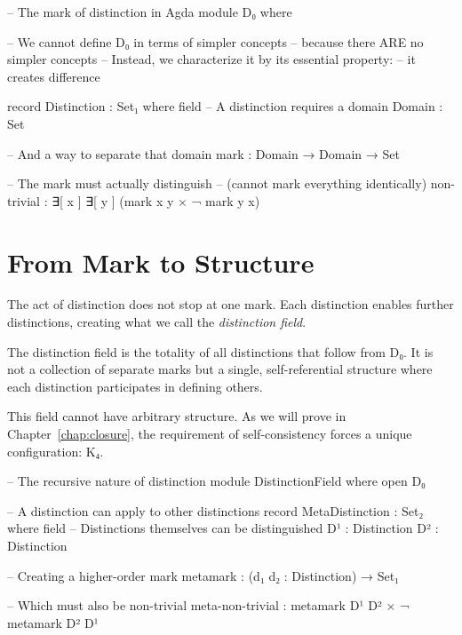 \begin{code}
-- The mark of distinction in Agda
module D₀ where

-- We cannot define D₀ in terms of simpler concepts
-- because there ARE no simpler concepts
-- Instead, we characterize it by its essential property:
-- it creates difference

record Distinction : Set₁ where
  field
    -- A distinction requires a domain
    Domain : Set
    
    -- And a way to separate that domain
    mark : Domain → Domain → Set
    
    -- The mark must actually distinguish
    -- (cannot mark everything identically)
    non-trivial : ∃[ x ] ∃[ y ] (mark x y × ¬ mark y x)
\end{code}

\section{From Mark to Structure}

The act of distinction does not stop at one mark. Each distinction enables further distinctions, creating what we call the \textit{distinction field}.

\begin{definition}
\label{def:distinction-field}
The distinction field is the totality of all distinctions that follow from D₀. It is not a collection of separate marks but a single, self-referential structure where each distinction participates in defining others.
\end{definition}

This field cannot have arbitrary structure. As we will prove in Chapter~\ref{chap:closure}, the requirement of self-consistency forces a unique configuration: K₄.

\begin{code}
-- The recursive nature of distinction
module DistinctionField where
  open D₀
  
  -- A distinction can apply to other distinctions
  record MetaDistinction : Set₂ where
    field
      -- Distinctions themselves can be distinguished
      D¹ : Distinction
      D² : Distinction
      
      -- Creating a higher-order mark
      metamark : (d₁ d₂ : Distinction) → Set₁
      
      -- Which must also be non-trivial
      meta-non-trivial : metamark D¹ D² × ¬ metamark D² D¹
\end{code}

